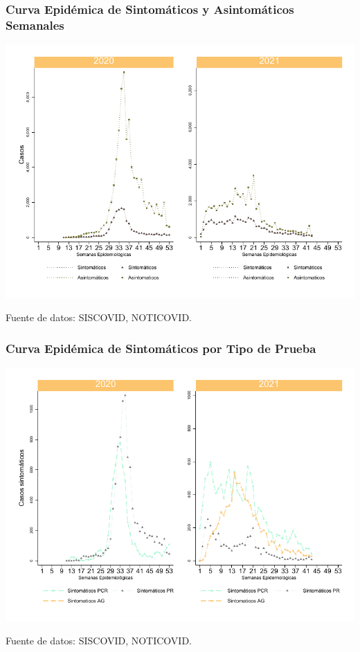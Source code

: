 \documentclass[xcolor=table]{beamer}
\begin{document}
	\begin{frame}
		\frametitle{Curva Epidémica de Sintomáticos y Asintomáticos Semanales}
		\vspace{-.5cm}
		\begin{center}
			\includegraphics[width=0.8\linewidth]{../figuras/sintomaticos_20_21.pdf}
		\end{center} 
		{\tiny Fuente de datos: SISCOVID, NOTICOVID.}
	\end{frame}
	
	\begin{frame}
		\frametitle{Curva Epidémica de Sintomáticos por Tipo de Prueba}
		\vspace{-.5cm}
		\begin{center}
			\includegraphics[width=0.9\linewidth, trim={0cm .5cm 0cm 0.2cm},clip]{../figuras/sinto_prueba_20_21.pdf}
		\end{center}
		{\tiny Fuente de datos: SISCOVID, NOTICOVID.}
	\end{frame}
	
\end{document}

